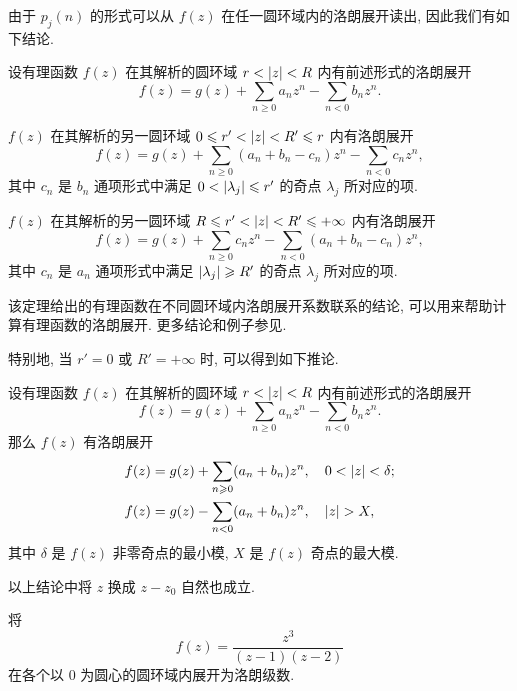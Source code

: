 由于 $p_j(n)$ 的形式可以从 $f(z)$ 在任一圆环域内的洛朗展开读出, 因此我们有如下结论.
  
\begin{theorem}
  \label{thm:rational-function-laurent}
  设有理函数 $f(z)$ 在其解析的圆环域 $r<\left|z\right|<R$ 内有前述形式的洛朗展开
  \[
    f(z)=g(z)+\sum_{n\ge 0} a_n z^n-\sum_{n<0} b_n z^n.
  \]
  \vspace{-\baselineskip}
  \begin{enuma}
    \item $f(z)$ 在其解析的另一圆环域 $0\leqslant r'<\left|z\right|<R'\leqslant r$ 内有洛朗展开
      \[
        f(z)=g(z)+\sum_{n\ge 0} (a_n+b_n-c_n) z^n-\sum_{n<0} c_n z^n,
      \]
      其中 $c_n$ 是 $b_n$ 通项形式中满足 $0<\left|\lambda_j\right|\leqslant r'$ 的奇点 $\lambda_j$ 所对应的项.
    \item $f(z)$ 在其解析的另一圆环域 $R\leqslant r'<\left|z\right|<R'\leqslant+\infty$ 内有洛朗展开
    \[
      f(z)=g(z)+\sum_{n\ge 0} c_n z^n-\sum_{n<0} (a_n+b_n-c_n) z^n,
    \]
    其中 $c_n$ 是 $a_n$ 通项形式中满足 $\left|\lambda_j\right|\geqslant R'$ 的奇点 $\lambda_j$ 所对应的项.
  \end{enuma}
\end{theorem}
  
该定理给出的有理函数在不同圆环域内洛朗展开系数联系的结论, 可以用来帮助计算有理函数的洛朗展开. 
更多结论和例子参见\cite{YuanZhang2024}.

特别地, 当 $r'=0$ 或 $R'=+\infty$ 时, 可以得到如下推论. 

\begin{corollary}
  \label{cor:rational-function-laurent}
  设有理函数 $f(z)$ 在其解析的圆环域 $r<\left|z\right|<R$ 内有前述形式的洛朗展开
  \[
    f(z)=g(z)+\sum_{n\ge 0} a_n z^n-\sum_{n<0} b_n z^n.
  \]
  那么 $f(z)$ 有洛朗展开
  \begin{align*}
    f(z)&=g(z)+\sum_{n\ge 0} (a_n+b_n) z^n,\quad 0<\abs{z}<\delta;\\
    f(z)&=g(z)-\sum_{n<0} (a_n+b_n) z^n,\quad \abs{z}>X,
  \end{align*} 
  其中 $\delta$ 是 $f(z)$ 非零奇点的最小模, $X$ 是 $f(z)$ 奇点的最大模.
\end{corollary}

以上结论中将 $z$ 换成 $z-z_0$ 自然也成立.

\begin{example}
  将
  \[
    f(z)=\dfrac{z^3}{(z-1)(z-2)}
  \]
  在各个以 $0$ 为圆心的圆环域内展开为洛朗级数. 
\end{example}

